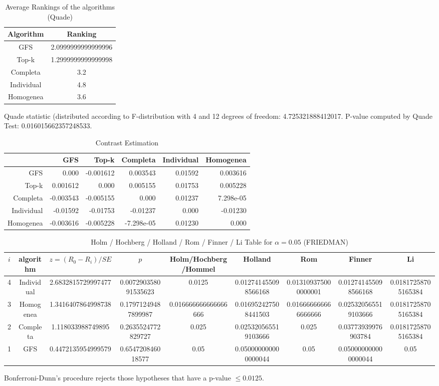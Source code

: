 \documentclass[a4paper,10pt]{article}
\begin{document}
\begin{landscape}
\newpage

\begin{table}[!htp]
\centering
\caption{Average Rankings of the algorithms (Quade)
}\begin{tabular}{c|c}
Algorithm&Ranking\\
\hline
GFS&2.0999999999999996\\
Top-k&1.2999999999999998\\
Completa&3.2\\
Individual&4.8\\
Homogenea&3.6\\
\end{tabular}
\end{table}
Quade statistic (distributed according to F-distribution with 4 and 12 degrees of freedom: 4.725321888412017. 
P-value computed by Quade Test: 0.016015662357248533.\newline


\newpage

\begin{table}[!htp]
\centering\tiny
\caption{Contrast Estimation}
\begin{tabular}{
|r|r|r|r|r|r|}
\hline
 &GFS&Top-k&Completa&Individual&Homogenea\\
\hline
GFS&0.000&-0.001612&0.003543&0.01592&0.003616\\
\hline
Top-k&0.001612&0.000&0.005155&0.01753&0.005228\\
\hline
Completa&-0.003543&-0.005155&0.000&0.01237&7.298e-05\\
\hline
Individual&-0.01592&-0.01753&-0.01237&0.000&-0.01230\\
\hline
Homogenea&-0.003616&-0.005228&-7.298e-05&0.01230&0.000\\
\hline

\end{tabular}
\end{table}

\newpage

\begin{table}[!htp]
\centering\scriptsize
\caption{Holm / Hochberg / Holland / Rom / Finner / Li Table for $\alpha=0.05$ (FRIEDMAN)}
\begin{tabular}{ccccccccc}
$i$&algorithm&$z=(R_0 - R_i)/SE$&$p$&Holm/Hochberg/Hommel&Holland&Rom&Finner&Li\\
\hline
4&Individual&2.6832815729997477&0.007290358091535623&0.0125&0.012741455098566168&0.013109375000000001&0.012741455098566168&0.01817258705165384\\
3&Homogenea&1.3416407864998738&0.17971249487899987&0.016666666666666666&0.016952427508441503&0.016666666666666666&0.025320565519103666&0.01817258705165384\\
2&Completa&1.118033988749895&0.2635524772829727&0.025&0.025320565519103666&0.025&0.03773939976903784&0.01817258705165384\\
1&GFS&0.4472135954999579&0.654720846018577&0.05&0.050000000000000044&0.05&0.050000000000000044&0.05\\
\hline
\end{tabular}
\end{table}
Bonferroni-Dunn's procedure rejects those hypotheses that have a p-value $\le0.0125$.



\end{landscape}
\end{document}
